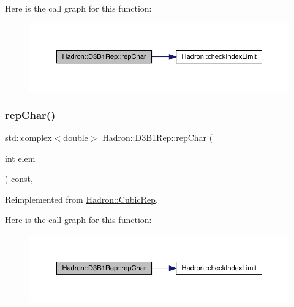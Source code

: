 Here is the call graph for this function\+:
\nopagebreak
\begin{figure}[H]
\begin{center}
\leavevmode
\includegraphics[width=350pt]{de/dc2/structHadron_1_1D3B1Rep_a3a5bf413079f99bedafb7134af0e5af1_cgraph}
\end{center}
\end{figure}
\mbox{\label{structHadron_1_1D3B1Rep_a3a5bf413079f99bedafb7134af0e5af1}} 
\subsubsection{\texorpdfstring{repChar()}{repChar()}\hspace{0.1cm}{\footnotesize\ttfamily [2/2]}}
{\footnotesize\ttfamily std\+::complex$<$double$>$ Hadron\+::\+D3\+B1\+Rep\+::rep\+Char (\begin{DoxyParamCaption}\item[{int}]{elem }\end{DoxyParamCaption}) const\hspace{0.3cm}{\ttfamily [inline]}, {\ttfamily [virtual]}}



Reimplemented from \mbox{\hyperlink{structHadron_1_1CubicRep_af45227106e8e715e84b0af69cd3b36f8}{Hadron\+::\+Cubic\+Rep}}.

Here is the call graph for this function\+:
\nopagebreak
\begin{figure}[H]
\begin{center}
\leavevmode
\includegraphics[width=350pt]{de/dc2/structHadron_1_1D3B1Rep_a3a5bf413079f99bedafb7134af0e5af1_cgraph}
\end{center}
\end{figure}
\mbox{\label{structHadron_1_1D3B1Rep_a2a0563aa28c476f89e8b13f3a95b7cfd}} 
